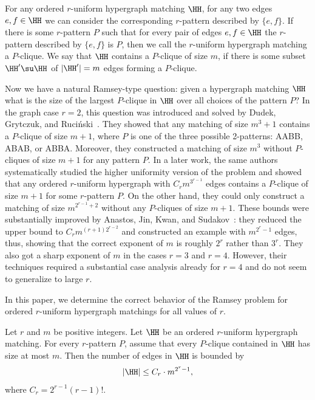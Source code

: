 For any ordered $r$-uniform hypergraph matching $\HH$, for any two edges $e,f\in\HH$ we can consider the corresponding $r$-pattern described by $\{ e,f\}$. If there is some $r$-pattern $P$ such that for every pair of edges $e,f\in\HH$ the $r$-pattern described by $\{ e,f\}$ is $P$, then we call the $r$-uniform hypergraph matching a $P$-clique. We say that $\HH$ contains a $P$-clique of size $m$, if there is some subset $\HH'\su \HH$ of $|\HH'|=m$ edges forming a $P$-clique.

Now we have a natural Ramsey-type question: given a hypergraph matching $\HH$ what is the size of the largest $P$-clique in $\HH$ over all choices of the pattern $P$? In the graph case $r=2$, this question was introduced and solved by
Dudek, Grytczuk, and Ruci\'nski~\cite{DGR22}. They showed that any matching of size $m^3+1$ contains a $P$-clique of size $m+1$, where $P$ is one of the three possible 2-patterns: AABB, ABAB, or ABBA. Moreover, they constructed a matching of size $m^3$ without $P$-cliques of size $m+1$ for any pattern $P$. 
In a later work, the same authors~\cite{DGR} systematically studied the higher uniformity version of the problem and showed that any ordered $r$-uniform hypergraph with $C_r m^{3^{r-1}}$ edges contains a $P$-clique of size $m+1$ for some $r$-pattern $P$. On the other hand, they could only construct a matching of size $m^{2^{r-1}+2}$ without any $P$-cliques of size $m+1$. These bounds were substantially improved by Anastos, Jin, Kwan, and Sudakov~\cite{AJKS}: they reduced the upper bound to $C_r m^{(r+1) 2^{r-2}}$ and constructed an example with $m^{2^{r}-1}$ edges, thus, showing that the correct exponent of $m$ is roughly $2^r$ rather than $3^r$. They also got a sharp exponent of $m$ in the cases $r=3$ and $r=4$. However, their techniques required a substantial case analysis already for $r=4$ and do not seem to generalize to large $r$.

In this paper, we determine the correct behavior of the Ramsey problem for ordered $r$-uniform hypergraph matchings for all values of $r$.

\begin{theorem} \label{thm-main}
Let $r$ and $m$ be positive integers. Let $\HH$ be an ordered $r$-uniform hypergraph matching. For every $r$-pattern $P$, assume that every $P$-clique contained in $\HH$ has size at most $m$. Then the number of edges in $\HH$ is bounded by
\[|\HH|\le C_r\cdot m^{2^r-1},\]
where $C_r=2^{r-1}(r-1)!$.
\end{theorem}

